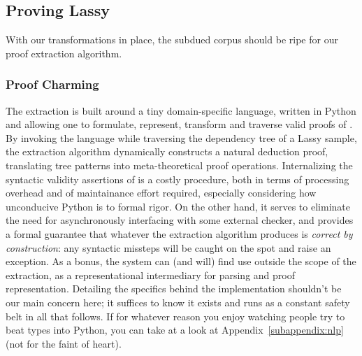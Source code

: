 \subsection{Proving Lassy}
With our transformations in place, the subdued corpus should be ripe for our proof extraction algorithm.

\subsubsection{Proof Charming}
The extraction is built around a tiny domain-specific language, written in Python and allowing one to formulate, represent, transform and traverse valid proofs of \LPplus{}.
By invoking the language while traversing the dependency tree of a Lassy sample, the extraction algorithm dynamically constructs a natural deduction proof, translating tree patterns into meta-theoretical proof operations.
Internalizing the syntactic validity assertions of \LPplus{} is a costly procedure, both in terms of processing overhead and of maintainance effort required, especially considering how unconducive Python is to formal rigor.
On the other hand, it serves to eliminate the need for asynchronously interfacing with some external checker, and provides a formal guarantee that whatever the extraction algorithm produces is \textit{correct by construction}: any syntactic missteps will be caught on the spot and raise an exception.
As a bonus, the system can (and will) find use outside the scope of the extraction, as a representational intermediary for parsing and proof representation.
Detailing the specifics behind the implementation shouldn't be our main concern here; it suffices to know it exists and runs as a constant safety belt in all that follows.
If for whatever reason you enjoy watching people try to beat types into Python, you can take at a look at Appendix~\ref{subappendix:nlp} (not for the faint of heart).

